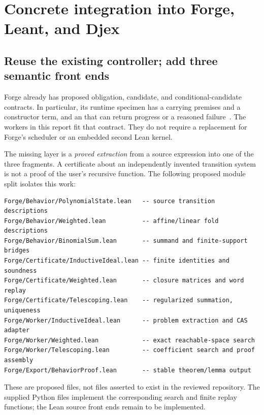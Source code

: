 \section{Concrete integration into Forge, Leant, and Djex}
\label{sec:integration}

\subsection{Reuse the existing controller; add three semantic front ends}

Forge already has proposed obligation, candidate, and conditional-candidate
contracts. In particular, its runtime specimen has a
 carrying premises and a constructor term, and an
 that can return progress or a reasoned failure~\cite{forge-runtime}.
The workers in this report fit that contract. They do not require a replacement
for Forge's scheduler or an embedded second Lean kernel.

The missing layer is a \emph{proved extraction} from a source expression into
one of the three fragments. A certificate about an independently invented
transition system is not a proof of the user's recursive function. The
following proposed module split isolates this work:

\par\noindent\begin{minipage}{\linewidth}
\begin{lstlisting}
Forge/Behavior/PolynomialState.lean   -- source transition descriptions
Forge/Behavior/Weighted.lean          -- affine/linear fold descriptions
Forge/Behavior/BinomialSum.lean       -- summand and finite-support bridges
Forge/Certificate/InductiveIdeal.lean -- finite identities and soundness
Forge/Certificate/Weighted.lean       -- closure matrices and word replay
Forge/Certificate/Telescoping.lean    -- regularized summation, uniqueness
Forge/Worker/InductiveIdeal.lean      -- problem extraction and CAS adapter
Forge/Worker/Weighted.lean            -- exact reachable-space search
Forge/Worker/Telescoping.lean         -- coefficient search and proof assembly
Forge/Export/BehaviorProof.lean       -- stable theorem/lemma output
\end{lstlisting}
\end{minipage}\par

These are proposed files, not files asserted to exist in the reviewed
repository. The supplied Python files implement the corresponding search and
finite replay functions; the Lean source front ends remain to be implemented.

